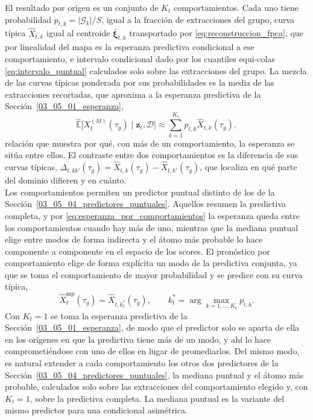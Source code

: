 El resultado por origen es un conjunto de $K_t$ comportamientos. Cada uno tiene probabilidad $p_{t,k} = \lvert \mathcal{G}_k \rvert / S$, igual a la fracción de extracciones del grupo, curva típica $\widehat{X}_{t,k}$ igual al centroide $\bar{\boldsymbol{\xi}}_{t,k}$ transportado por \eqref{eq:reconstruccion_fpca}, que por linealidad del mapa es la esperanza predictiva condicional a ese comportamiento, e intervalo condicional dado por los cuantiles equi-colas \eqref{eq:intervalo_puntual} calculados solo sobre las extracciones del grupo. La mezcla de las curvas típicas ponderada por sus probabilidades es la media de las extracciones recortadas, que aproxima a la esperanza predictiva de la Sección~\ref{03_05_01_esperanza},
\begin{equation}\label{eq:esperanza_por_comportamientos}
    \widehat{\mathbb{E}}\bigl[X_t^{(M)}(\tau_g) \mid \mathbf{z}_t, \mathcal{D}\bigr]
    \approx \sum_{k=1}^{K_t} p_{t,k}\widehat{X}_{t,k}(\tau_g),
\end{equation}
relación que muestra por qué, con más de un comportamiento, la esperanza se sitúa entre ellos. El contraste entre dos comportamientos es la diferencia de sus curvas típicas, $\Delta_{t,kk'}(\tau_g) = \widehat{X}_{t,k}(\tau_g) - \widehat{X}_{t,k'}(\tau_g)$, que localiza en qué parte del dominio difieren y en cuánto.\\

Los comportamientos permiten un predictor puntual distinto de los de la Sección~\ref{03_05_04_predictores_puntuales}. Aquellos resumen la predictiva completa, y por \eqref{eq:esperanza_por_comportamientos} la esperanza queda entre los comportamientos cuando hay más de uno, mientras que la mediana puntual elige entre modos de forma indirecta y el átomo más probable lo hace componente a componente en el espacio de los scores. El pronóstico por comportamiento elige de forma explícita un modo de la predictiva conjunta, ya que se toma el comportamiento de mayor probabilidad y se predice con su curva típica,
\begin{equation}\label{eq:pronostico_comportamiento}
    \widehat{X}_t^{\mathrm{mp}}(\tau_g) = \widehat{X}_{t,k_t^{*}}(\tau_g),
    \qquad
    k_t^{*} = \arg\max_{k = 1, \ldots, K_t} p_{t,k}.
\end{equation}
Con $K_t = 1$ se toma la esperanza predictiva de la Sección~\ref{03_05_01_esperanza}, de modo que el predictor solo se aparta de ella en los orígenes en que la predictiva tiene más de un modo, y ahí lo hace comprometiéndose con uno de ellos en lugar de promediarlos. Del mismo modo, es natural extender a cada comportamiento los otros dos predictores de la Sección~\ref{03_05_04_predictores_puntuales}, la mediana puntual y el átomo más probable, calculados solo sobre las extracciones del comportamiento elegido y, con $K_t = 1$, sobre la predictiva completa. La mediana puntual es la variante del mismo predictor para una condicional asimétrica.\\

